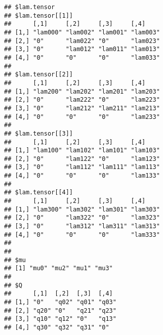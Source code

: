 \documentclass[
]{article}
\begin{document}
\begin{verbatim}
## $lam.tensor
## $lam.tensor[[1]]
##      [,1]     [,2]     [,3]     [,4]    
## [1,] "lam000" "lam002" "lam001" "lam003"
## [2,] "0"      "lam022" "0"      "lam023"
## [3,] "0"      "lam012" "lam011" "lam013"
## [4,] "0"      "0"      "0"      "lam033"
## 
## $lam.tensor[[2]]
##      [,1]     [,2]     [,3]     [,4]    
## [1,] "lam200" "lam202" "lam201" "lam203"
## [2,] "0"      "lam222" "0"      "lam223"
## [3,] "0"      "lam212" "lam211" "lam213"
## [4,] "0"      "0"      "0"      "lam233"
## 
## $lam.tensor[[3]]
##      [,1]     [,2]     [,3]     [,4]    
## [1,] "lam100" "lam102" "lam101" "lam103"
## [2,] "0"      "lam122" "0"      "lam123"
## [3,] "0"      "lam112" "lam111" "lam113"
## [4,] "0"      "0"      "0"      "lam133"
## 
## $lam.tensor[[4]]
##      [,1]     [,2]     [,3]     [,4]    
## [1,] "lam300" "lam302" "lam301" "lam303"
## [2,] "0"      "lam322" "0"      "lam323"
## [3,] "0"      "lam312" "lam311" "lam313"
## [4,] "0"      "0"      "0"      "lam333"
## 
## 
## $mu
## [1] "mu0" "mu2" "mu1" "mu3"
## 
## $Q
##      [,1]  [,2]  [,3]  [,4] 
## [1,] "0"   "q02" "q01" "q03"
## [2,] "q20" "0"   "q21" "q23"
## [3,] "q10" "q12" "0"   "q13"
## [4,] "q30" "q32" "q31" "0"
\end{verbatim}
\end{document}
